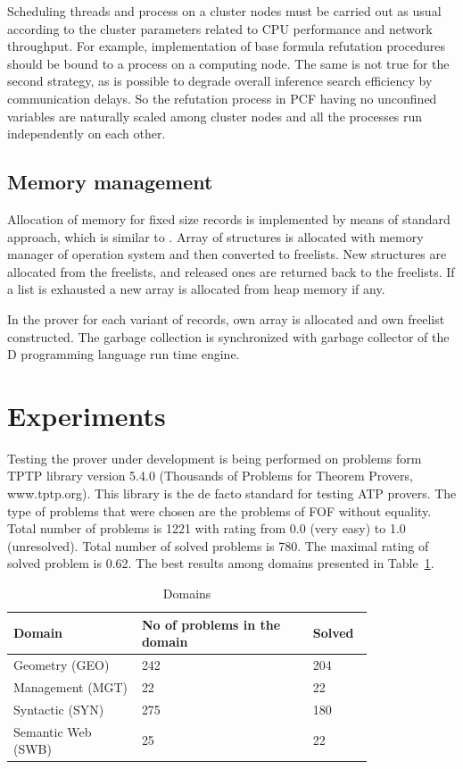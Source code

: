 \documentclass[runningheads,a4paper]{llncs}
\begin{document}
Scheduling threads and process on a cluster nodes must be carried out as usual according to the cluster parameters related to CPU performance and network throughput. For example, implementation of base formula refutation procedures should be bound to a process on a computing node. The same is not true for the second strategy, as is possible to degrade overall inference search efficiency by communication delays. So the refutation process in PCF having no unconfined variables are naturally scaled among cluster nodes and all the processes run independently on each other.

\subsection{Memory management}
Allocation of memory for fixed size records is implemented by means of standard approach, which is similar to \cite{gmemory}. Array of structures is allocated with memory manager of operation system and then converted to freelists. New structures are allocated from the freelists, and released ones are returned back to the freelists. If a list is exhausted a new array is allocated from heap memory if any.

In the prover for each variant of records, own array is allocated and own freelist constructed. The garbage collection is synchronized with garbage collector of the D programming language run time engine.


\section{Experiments}
Testing the prover under development is being performed on problems form TPTP \cite{tptp} library version 5.4.0 (Thousands of Problems for Theorem Provers, www.tptp.org). This library is the de facto standard for testing ATP provers. The type of problems that were chosen are the problems of FOF without equality. Total number of problems is 1221 with rating from 0.0 (very easy) to 1.0 (unresolved). Total number of solved problems is 780. The maximal rating of solved problem is 0.62. The best results among domains presented in Table~\ref{tbl:1}.

\begin{table}
\caption{Domains}\label{tbl:1}
\begin{tabular}{|p{0.3\linewidth}|p{0.4\linewidth}|p{0.1\linewidth}|}

\hline
\textbf{Domain} & \textbf{No of problems in the domain} & \textbf{Solved} \\
\hline
Geometry (GEO) & 242 & 204 \\
\hline
Management (MGT) & 22 & 22 \\
\hline
Syntactic  (SYN) & 275 & 180 \\
\hline
Semantic Web  (SWB) & 25 & 22 \\
\hline
\end{tabular}
\end{table}
\end{document}
